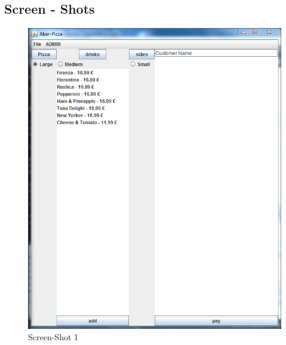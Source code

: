 \documentclass[11pt,a4paper]{article}
\begin{document}
\begin{flushleft}
\section{Screen - Shots}
 \begin{figure}[ht]
	\centering
 	\includegraphics[scale=0.4]{../Sceenshots/Capture.PNG} 
	\caption{Screen-Shot 1}
\end{figure}


\end{flushleft}
\end{document}
